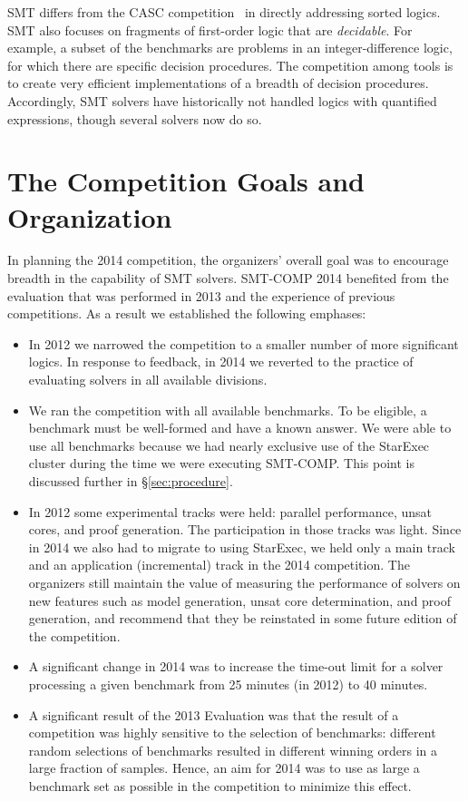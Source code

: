 \documentclass[twoside,11pt]{article}
\begin{document}
SMT differs from the CASC competition~\cite{PSS02} in directly addressing sorted logics. SMT also focuses on fragments of first-order logic that are \emph{decidable}. For example, a subset of the benchmarks are problems in an integer-difference logic, for which there are specific decision procedures. The competition among tools is to create very efficient implementations of a breadth of decision procedures. Accordingly, SMT solvers have historically not handled logics with quantified expressions, though several solvers now do so.

\section{The Competition Goals and Organization}
\label{sec:goals}

In planning the 2014 competition, the organizers' overall goal was to encourage breadth
in the capability of SMT solvers. SMT-COMP 2014 benefited from the evaluation that was performed in 2013 and the experience of previous competitions. As a result we established the following emphases:
\begin{itemize}
\item In 2012 we narrowed the competition to a smaller number of more significant logics. In response to feedback, in 2014 we reverted to the practice of evaluating solvers in all available divisions.
\item We ran the competition with all available benchmarks. To be eligible, a benchmark must be well-formed and have a known answer. We were able to use all benchmarks because we had nearly exclusive use of the StarExec cluster during the time we were executing SMT-COMP. This point is discussed further in \S\ref{sec:procedure}.
\item In 2012 some experimental tracks were held: parallel performance, unsat cores, and proof generation. The participation in those tracks was light. Since in 2014 we also had to migrate to using StarExec, we held only a main track and an application (incremental) track in the 2014 competition. The organizers still maintain the value of measuring the performance of solvers on new features such as model generation, unsat core determination, and proof generation, and recommend that they be reinstated in some future edition of the competition.
\item A significant change in 2014 was to increase the time-out limit for a solver processing a given benchmark from 25 minutes (in 2012) to 40 minutes.
\item A significant result of the 2013 Evaluation was that the result of a competition was highly sensitive to the selection of benchmarks: different random selections of benchmarks resulted in different winning orders in a large fraction of samples. Hence, an aim for 2014 was to use as large a benchmark set as possible in the competition to minimize this effect.



\end{itemize}
\end{document}
